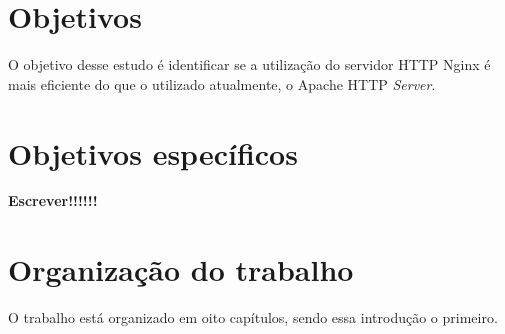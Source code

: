 \section{Objetivos}
O objetivo desse estudo é identificar se a utilização do servidor HTTP Nginx é 
mais eficiente do que o utilizado atualmente, o Apache HTTP \textit{Server}.\\
\section{Objetivos específicos}
\textbf{Escrever!!!!!!}
\section{Organização do trabalho}
O trabalho está organizado em oito capítulos, sendo essa introdução o primeiro. 
